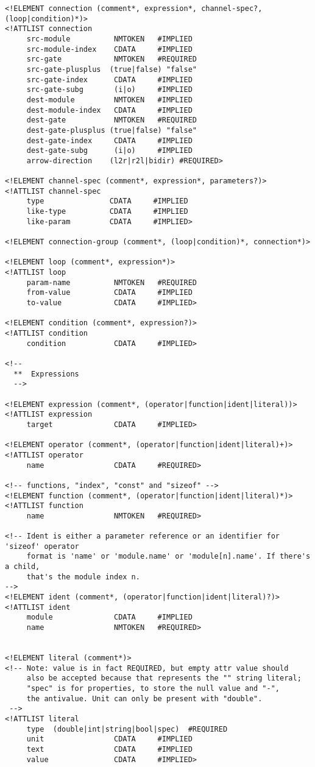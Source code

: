 \begin{verbatim}
<!ELEMENT connection (comment*, expression*, channel-spec?, (loop|condition)*)>
<!ATTLIST connection
     src-module          NMTOKEN   #IMPLIED
     src-module-index    CDATA     #IMPLIED
     src-gate            NMTOKEN   #REQUIRED
     src-gate-plusplus  (true|false) "false"
     src-gate-index      CDATA     #IMPLIED
     src-gate-subg       (i|o)     #IMPLIED
     dest-module         NMTOKEN   #IMPLIED
     dest-module-index   CDATA     #IMPLIED
     dest-gate           NMTOKEN   #REQUIRED
     dest-gate-plusplus (true|false) "false"
     dest-gate-index     CDATA     #IMPLIED
     dest-gate-subg      (i|o)     #IMPLIED
     arrow-direction    (l2r|r2l|bidir) #REQUIRED>

<!ELEMENT channel-spec (comment*, expression*, parameters?)>
<!ATTLIST channel-spec
     type               CDATA     #IMPLIED
     like-type          CDATA     #IMPLIED
     like-param         CDATA     #IMPLIED>

<!ELEMENT connection-group (comment*, (loop|condition)*, connection*)>

<!ELEMENT loop (comment*, expression*)>
<!ATTLIST loop
     param-name          NMTOKEN   #REQUIRED
     from-value          CDATA     #IMPLIED
     to-value            CDATA     #IMPLIED>

<!ELEMENT condition (comment*, expression?)>
<!ATTLIST condition
     condition           CDATA     #IMPLIED>

<!--
  **  Expressions
  -->

<!ELEMENT expression (comment*, (operator|function|ident|literal))>
<!ATTLIST expression
     target              CDATA     #IMPLIED>

<!ELEMENT operator (comment*, (operator|function|ident|literal)+)>
<!ATTLIST operator
     name                CDATA     #REQUIRED>

<!-- functions, "index", "const" and "sizeof" -->
<!ELEMENT function (comment*, (operator|function|ident|literal)*)>
<!ATTLIST function
     name                NMTOKEN   #REQUIRED>

<!-- Ident is either a parameter reference or an identifier for 'sizeof' operator
     format is 'name' or 'module.name' or 'module[n].name'. If there's a child,
     that's the module index n.
-->
<!ELEMENT ident (comment*, (operator|function|ident|literal)?)>
<!ATTLIST ident
     module              CDATA     #IMPLIED
     name                NMTOKEN   #REQUIRED>


<!ELEMENT literal (comment*)>
<!-- Note: value is in fact REQUIRED, but empty attr value should
     also be accepted because that represents the "" string literal;
     "spec" is for properties, to store the null value and "-",
     the antivalue. Unit can only be present with "double".
 -->
<!ATTLIST literal
     type  (double|int|string|bool|spec)  #REQUIRED
     unit                CDATA     #IMPLIED
     text                CDATA     #IMPLIED
     value               CDATA     #IMPLIED>


\end{verbatim}
